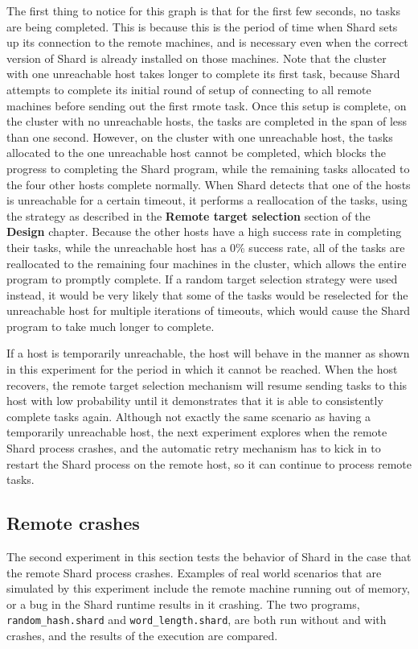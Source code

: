 \documentclass[oneside]{report}
\begin{document}
The first thing to notice for this graph is that for the first few seconds, no tasks are being completed.
This is because this is the period of time when Shard sets up its connection to the remote machines, and is necessary even when the correct version of Shard is already installed on those machines.
Note that the cluster with one unreachable host takes longer to complete its first task, because Shard attempts to complete its initial round of setup of connecting to all remote machines before sending out the first rmote task.
Once this setup is complete, on the cluster with no unreachable hosts, the tasks are completed in the span of less than one second.
However, on the cluster with one unreachable host, the tasks allocated to the one unreachable host cannot be completed, which blocks the progress to completing the Shard program, while the remaining tasks allocated to the four other hosts complete normally.
When Shard detects that one of the hosts is unreachable for a certain timeout, it performs a reallocation of the tasks, using the strategy as described in the \textbf{Remote target selection} section of the \textbf{Design} chapter.
Because the other hosts have a high success rate in completing their tasks, while the unreachable host has a 0\% success rate, all of the tasks are reallocated to the remaining four machines in the cluster, which allows the entire program to promptly complete.
If a random target selection strategy were used instead, it would be very likely that some of the tasks would be reselected for the unreachable host for multiple iterations of timeouts, which would cause the Shard program to take much longer to complete.

If a host is temporarily unreachable, the host will behave in the manner as shown in this experiment for the period in which it cannot be reached. When the host recovers, the remote target selection mechanism will resume sending tasks to this host with low probability until it demonstrates that it is able to consistently complete tasks again.
Although not exactly the same scenario as having a temporarily unreachable host, the next experiment explores when the remote Shard process crashes, and the automatic retry mechanism has to kick in to restart the Shard process on the remote host, so it can continue to process remote tasks.

\subsection{Remote crashes}
The second experiment in this section tests the behavior of Shard in the case that the remote Shard process crashes.
Examples of real world scenarios that are simulated by this experiment include the remote machine running out of memory, or a bug in the Shard runtime results in it crashing.
The two programs, \texttt{random\_hash.shard} and \texttt{word\_length.shard}, are both run without and with crashes, and the results of the execution are compared.
\end{document}
